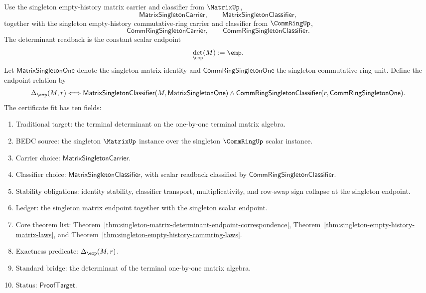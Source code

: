\begin{definition}
\label{def:singleton-matrix-determinant-certificate}
Use the singleton empty-history matrix carrier and classifier from
$\MatrixUp$,
$$
\mathsf{MatrixSingletonCarrier},\qquad
\mathsf{MatrixSingletonClassifier},
$$
together with the singleton empty-history commutative-ring carrier and
classifier from $\CommRingUp$,
$$
\mathsf{CommRingSingletonCarrier},\qquad
\mathsf{CommRingSingletonClassifier}.
$$
The determinant readback is the constant scalar endpoint
$$
\det_{\emp}(M):=\emp.
$$
Let $\mathsf{MatrixSingletonOne}$ denote the singleton matrix identity and
$\mathsf{CommRingSingletonOne}$ the singleton commutative-ring unit. Define
the endpoint relation by
$$
\Delta_{\emp}(M,r)
\Longleftrightarrow
\mathsf{MatrixSingletonClassifier}(M,\mathsf{MatrixSingletonOne})
\land
\mathsf{CommRingSingletonClassifier}(r,\mathsf{CommRingSingletonOne}).
$$
The certificate fit has ten fields:
\begin{enumerate}
  \item Traditional target: the terminal determinant on the one-by-one
  terminal matrix algebra.
  \item BEDC source: the singleton $\MatrixUp$ instance over the singleton
  $\CommRingUp$ scalar instance.
  \item Carrier choice: $\mathsf{MatrixSingletonCarrier}$.
  \item Classifier choice: $\mathsf{MatrixSingletonClassifier}$, with scalar
  readback classified by $\mathsf{CommRingSingletonClassifier}$.
  \item Stability obligations: identity stability, classifier transport,
  multiplicativity, and row-swap sign collapse at the singleton endpoint.
  \item Ledger: the singleton matrix endpoint together with the singleton
  scalar endpoint.
  \item Core theorem list:
  Theorem~\ref{thm:singleton-matrix-determinant-endpoint-correspondence},
  Theorem~\ref{thm:singleton-empty-history-matrix-laws}, and
  Theorem~\ref{thm:singleton-empty-history-commring-laws}.
  \item Exactness predicate: $\Delta_{\emp}(M,r)$.
  \item Standard bridge: the determinant of the terminal one-by-one matrix
  algebra.
  \item Status: $\mathsf{ProofTarget}$.
\end{enumerate}
\end{definition}

